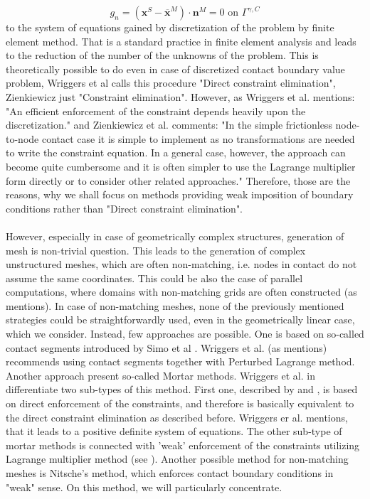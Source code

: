 \documentclass{article}
\newcommand{\beq}{\begin{equation}}
\newcommand{\eeq}{\end{equation}}
\begin{document}
\beq
g_{n}=\left(\mathbf{x}^{S}-\overline{\mathbf{x}}^{M}\right) \cdot \mathbf{n}^{M} = 0 \text{ on } \Gamma^{\gamma,C}
\nonumber
\eeq  
to the system of equations gained by discretization of the problem by finite element method. That is a standard practice in finite element analysis and leads to the reduction of the number of the unknowns of the problem. This is theoretically possible to do even in case of discretized contact boundary value problem, Wriggers et al \cite[Chapter 5, p.104]{Wriggers} calls this procedure "Direct constraint elimination", Zienkiewicz \cite[Chapter 7, p.195]{Zienkiewicz2} just "Constraint elimination". However, as Wriggers et al. \cite[Chapter 5, p.104]{Wriggers} mentions: "An efficient enforcement of the constraint depends heavily upon the discretization." and Zienkiewicz et al. \cite[Chapter 7, p.195]{Zienkiewicz2} comments: "In the simple frictionless node-to-node contact case it is simple to implement as no transformations are needed to write the constraint equation. In a general case, however, the approach can become quite cumbersome and it is often simpler to use the Lagrange multiplier form directly or to consider other related approaches." Therefore, those are the reasons, why we shall focus on methods providing weak imposition of boundary conditions rather than "Direct constraint elimination".  
\\
\\
However, especially in case of geometrically complex structures, generation of mesh is non-trivial question. This leads to the generation of complex unstructured meshes, which are often non-matching, i.e. nodes in contact do not assume the same coordinates. This could be also the case of parallel computations, where domains with non-matching grids are often constructed (as \cite[Chapter 7, p.183]{Wriggers} mentions). In case of non-matching meshes, none of the previously mentioned strategies could be straightforwardly used, even in the geometrically linear case, which we consider. Instead, few approaches are possible. One is based on so-called contact segments introduced by Simo et al \cite{Simo}.  Wriggers et al. (as \cite[Chapter 7, p.183]{Wriggers} mentions) recommends using contact segments together with Perturbed Lagrange method. Another approach present so-called Mortar methods. Wriggers et al. in \cite[Chapter 7, p.188-189]{Wriggers} differentiate two sub-types of this method. First one, described by \cite{Bernadi}and \cite{Wohlmuth}, is based on direct enforcement of the constraints, and therefore is basically equivalent to the direct constraint elimination as described before. Wriggers er al. \cite[Chapter 7, p.189]{Wriggers} mentions, that it leads to a positive definite system of equations. The other sub-type of mortar methods is connected with 'weak' enforcement of the constraints utilizing Lagrange multiplier method (see \cite{Wohlmuth}). Another possible method for non-matching meshes is Nitsche's method, which enforces contact boundary conditions in "weak" sense. On this method, we will particularly concentrate.
\end{document}
